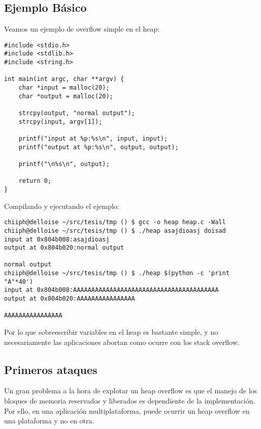 	\subsection{Ejemplo B\'asico}
	
	Veamos un ejemplo de overflow simple en el heap:
	
	\vspace{5 mm}
	
	\begin{lstlisting}
#include <stdio.h>
#include <stdlib.h>
#include <string.h>

int main(int argc, char **argv) {
	char *input = malloc(20);
	char *output = malloc(20);

	strcpy(output, "normal output");
	strcpy(input, argv[1]);

	printf("input at %p:%s\n", input, input);
	printf("output at %p:%s\n", output, output);

	printf("\n%s\n", output);

	return 0;
}
	\end{lstlisting}
	
	\vspace{5 mm}
	
	Compilando y ejecutando el ejemplo:
	
	\vspace{5 mm}
	
	\begin{lstlisting}
chiiph@delloise ~/src/tesis/tmp () $ gcc -o heap heap.c -Wall
chiiph@delloise ~/src/tesis/tmp () $ ./heap asajdioasj doisad
input at 0x804b008:asajdioasj
output at 0x804b020:normal output

normal output
chiiph@delloise ~/src/tesis/tmp () $ ./heap $(python -c 'print "A"*40')
input at 0x804b008:AAAAAAAAAAAAAAAAAAAAAAAAAAAAAAAAAAAAAAAA
output at 0x804b020:AAAAAAAAAAAAAAAA

AAAAAAAAAAAAAAAA
	\end{lstlisting}
	
	\vspace{5 mm}
	
	Por lo que sobreescribir variables en el heap es bastante simple, y no necesariamente las aplicaciones abortan como ocurre con los stack overflow.
	
	\subsection{Primeros ataques}
	
	Un gran problema a la hora de explotar un heap overflow es que el manejo de los bloques de memoria reservados y liberados es dependiente de la implementaci\'on. Por ello, en una aplicaci\'on multiplataforma, puede ocurrir un heap overflow en una plataforma y no en otra.
	

